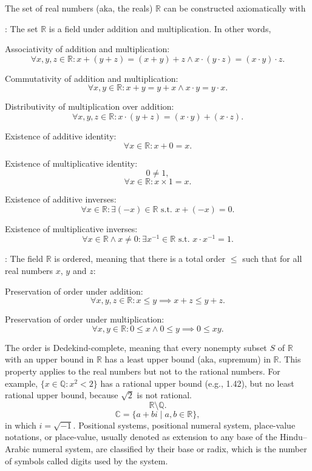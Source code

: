 \documentclass[a4paper,12pt]{report}
\begin{document}
The set of real numbers (aka, the reals) $\mathbb{R}$ can be constructed axiomatically with
\bit
\item {}: The set $\mathbb{R}$ is a field under addition and multiplication. In other words,
\bit
\item Associativity of addition and multiplication:
\[\forall x,y,z\in\mathbb{R}\colon x+(y+z)=(x+y)+z\land x\cdot(y\cdot z)=(x\cdot y)\cdot z.\]
\item Commutativity of addition and multiplication:
\[\forall x,y\in\mathbb{R}\colon x+y=y+x\land x\cdot y=y\cdot x.\]
\item Distributivity of multiplication over addition:
\[\forall x,y,z\in\mathbb{R}\colon x\cdot(y+z)=(x\cdot y)+(x\cdot z).\]
\item Existence of additive identity:
\[\forall x\in\mathbb{R}\colon x+0=x.\]
\item Existence of multiplicative identity:
\[0\neq 1,\]
\[\forall x\in\mathbb{R}\colon x\times 1=x.\]
\item Existence of additive inverses:
\[\forall x\in\mathbb{R}\colon\exists(-x)\in\mathbb{R}\text{\ s.t.\ }x+(-x)=0.\]
\item Existence of multiplicative inverses:
\[\forall x\in\mathbb{R}\land x\neq 0\colon\exists x^{-1}\in\mathbb{R}\text{\ s.t.\ }x\cdot x^{-1}=1.\]
\eit
\item {}: The field $\mathbb{R}$ is ordered, meaning that there is a total order $\leq$ such that for all real numbers $x$, $y$ and $z$:
\bit
\item Preservation of order under addition:
\[\forall x,y,z\in\mathbb{R}\colon x\leq y\implies x+z\leq y+z.\]
\item Preservation of order under multiplication:
\[\forall x,y\in\mathbb{R}\colon 0\leq x\land 0\leq y\implies 0\leq xy.\]
\item The order is Dedekind-complete, meaning that every nonempty subset $S$ of $\mathbb{R}$ with an upper bound in $\mathbb{R}$ has a least upper bound (aka, supremum) in $\mathbb{R}$. This property applies to the real numbers but not to the rational numbers. For example, $\{x\in\mathbb{Q}\colon x^2<2\}$ has a rational upper bound (e.g., 1.42), but no least rational upper bound, because $\sqrt{2}$ is not rational.
\eit\eit
{}
\[\mathbb{R}\setminus\mathbb{Q}.\]
\[\mathbb{C}=\{a+bi\mid a,b\in\mathbb{R}\},\]
in which $i=\sqrt{-1}$.
Positional systems, positional numeral system, place-value notations, or place-value, usually denoted as extension to any base of the Hindu–Arabic numeral system, are classified by their base or radix, which is the number of symbols called digits used by the system.
\end{document}
